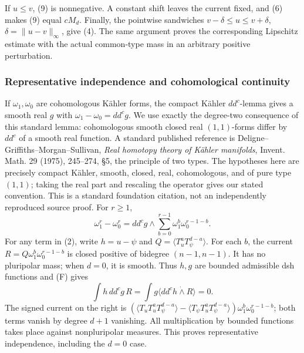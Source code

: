 \documentclass[
  11pt,
]{article}
\begin{document}
If \(u\leq v\), (9) is nonnegative. A constant shift leaves the current
fixed, and (6) makes (9) equal \(cM_d\). Finally, the pointwise
sandwiches \(v-\delta\leq u\leq v+\delta\), \(\delta=\|u-v\|_\infty\),
give (4). The same argument proves the corresponding Lipschitz estimate
with the actual common-type mass in an arbitrary positive perturbation.

\subsubsection{Representative independence and cohomological
continuity}\label{representative-independence-and-cohomological-continuity}

If \(\omega_1,\omega_0\) are cohomologous Kähler forms, the compact
Kähler \(dd^c\)-lemma gives a smooth real \(g\) with
\(\omega_1-\omega_0=dd^cg\). We use exactly the degree-two consequence
of this standard lemma: cohomologous smooth closed real \((1,1)\)-forms
differ by \(dd^c\) of a smooth real function. A standard published
reference is Deligne--Griffiths--Morgan--Sullivan, \emph{Real homotopy
theory of Kähler manifolds}, Invent. Math. 29 (1975), 245--274, §5, the
principle of two types. The hypotheses here are precisely compact
Kähler, smooth, closed, real, cohomologous, and of pure type \((1,1)\);
taking the real part and rescaling the operator gives our stated
convention. This is a standard foundation citation, not an independently
reproduced source proof. For \(r\geq1\), \[
\omega_1^r-\omega_0^r=dd^cg\wedge\sum_{b=0}^{r-1}\omega_1^b\omega_0^{r-1-b}.
\] For any term in (2), write \(h=u-\psi\) and
\(Q=\langle T_u^aT_\psi^{d-a}\rangle\). For each \(b\), the current
\(R=Q\omega_1^b\omega_0^{r-1-b}\) is closed positive of bidegree
\((n-1,n-1)\). It has no pluripolar mass; when \(d=0\), it is smooth.
Thus \(h,g\) are bounded admissible dsh functions and (F) gives \[
\int h\,dd^cg\,R=\int g\langle dd^ch\dot\wedge R\rangle=0.
\tag{11}
\] The signed current on the right is
\((\langle T_uT_u^aT_\psi^{d-a}\rangle-
\langle T_\psi T_u^aT_\psi^{d-a}\rangle)\omega_1^b\omega_0^{r-1-b}\);
both terms vanish by degree \(d+1\) vanishing. All multiplication by
bounded functions takes place against nonpluripolar measures. This
proves representative independence, including the \(d=0\) case.
\end{document}
